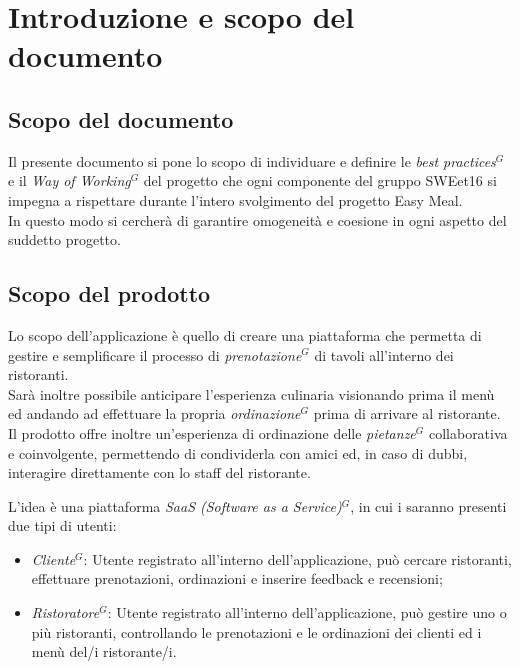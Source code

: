 \nonstopmode
\section{Introduzione e scopo del documento}

    \subsection{Scopo del documento}

    Il presente documento si pone lo scopo di individuare e definire le \emph{best practices}$^{G}$ e il \emph{Way of Working}$^{G}$ del progetto che ogni componente del gruppo SWEet16
    si impegna a rispettare durante l’intero svolgimento del progetto Easy Meal. \\
    In questo modo si cercherà di garantire omogeneità e coesione in ogni aspetto del suddetto progetto.

    \subsection{Scopo del prodotto}

    Lo scopo dell’applicazione è quello di creare una piattaforma che permetta di gestire e semplificare il processo di \emph{prenotazione}$^{G}$ di tavoli all’interno dei ristoranti. \\
    Sarà inoltre possibile anticipare l’esperienza culinaria visionando prima il menù ed andando ad effettuare la propria \emph{ordinazione}$^{G}$ prima di arrivare al ristorante. \\
    Il prodotto offre inoltre un’esperienza di ordinazione delle \emph{pietanze}$^{G}$ collaborativa e coinvolgente, permettendo di condividerla con amici ed, in caso di dubbi, interagire direttamente con lo staff del ristorante.

    L’idea è una piattaforma \emph{SaaS (Software as a Service)}$^{G}$, in cui i saranno presenti due tipi di utenti:

\begin{itemize}
\item \emph{Cliente}$^{G}$: Utente registrato all’interno dell’applicazione, può cercare ristoranti, effettuare prenotazioni, ordinazioni e inserire feedback e recensioni;
\item \emph{Ristoratore}$^{G}$: Utente registrato all’interno dell’applicazione, può gestire uno o più ristoranti, controllando le prenotazioni e le ordinazioni dei clienti ed i menù del/i ristorante/i.
\end{itemize}

